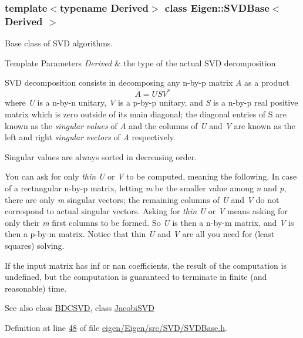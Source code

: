 \subsubsection*{template$<$typename Derived$>$\newline
class Eigen\+::\+S\+V\+D\+Base$<$ Derived $>$}

Base class of S\+VD algorithms. 


\begin{DoxyTemplParams}{Template Parameters}
{\em Derived} & the type of the actual S\+VD decomposition\\
\hline
\end{DoxyTemplParams}
S\+VD decomposition consists in decomposing any n-\/by-\/p matrix {\itshape A} as a product \[ A = U S V^* \] where {\itshape U} is a n-\/by-\/n unitary, {\itshape V} is a p-\/by-\/p unitary, and {\itshape S} is a n-\/by-\/p real positive matrix which is zero outside of its main diagonal; the diagonal entries of S are known as the {\itshape singular} {\itshape values} of {\itshape A} and the columns of {\itshape U} and {\itshape V} are known as the left and right {\itshape singular} {\itshape vectors} of {\itshape A} respectively.

Singular values are always sorted in decreasing order.

You can ask for only {\itshape thin} {\itshape U} or {\itshape V} to be computed, meaning the following. In case of a rectangular n-\/by-\/p matrix, letting {\itshape m} be the smaller value among {\itshape n} and {\itshape p}, there are only {\itshape m} singular vectors; the remaining columns of {\itshape U} and {\itshape V} do not correspond to actual singular vectors. Asking for {\itshape thin} {\itshape U} or {\itshape V} means asking for only their {\itshape m} first columns to be formed. So {\itshape U} is then a n-\/by-\/m matrix, and {\itshape V} is then a p-\/by-\/m matrix. Notice that thin {\itshape U} and {\itshape V} are all you need for (least squares) solving.

If the input matrix has inf or nan coefficients, the result of the computation is undefined, but the computation is guaranteed to terminate in finite (and reasonable) time. \begin{DoxySeeAlso}{See also}
class \hyperlink{group___s_v_d___module_class_eigen_1_1_b_d_c_s_v_d}{B\+D\+C\+S\+VD}, class \hyperlink{group___s_v_d___module_class_eigen_1_1_jacobi_s_v_d}{Jacobi\+S\+VD} 
\end{DoxySeeAlso}


Definition at line \hyperlink{eigen_2_eigen_2src_2_s_v_d_2_s_v_d_base_8h_source_l00048}{48} of file \hyperlink{eigen_2_eigen_2src_2_s_v_d_2_s_v_d_base_8h_source}{eigen/\+Eigen/src/\+S\+V\+D/\+S\+V\+D\+Base.\+h}.

